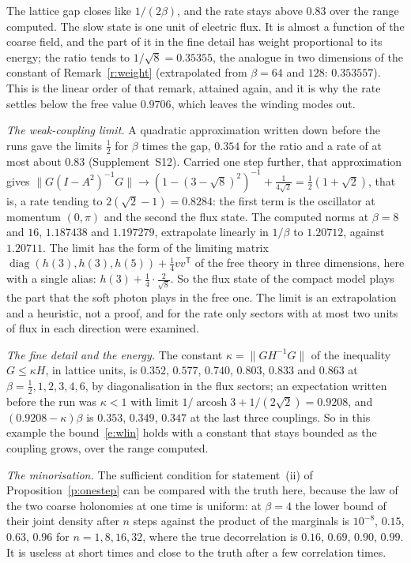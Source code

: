 The lattice gap closes like $1/(2\beta)$, and the rate stays above $0.83$ over the range computed. The slow
state is one unit of electric flux. It is almost a function of the coarse field, and the part of it in the
fine detail has weight proportional to its energy; the ratio tends to $1/\sqrt8=0.35355$, the analogue in two
dimensions of the constant of Remark~\ref{r:weight} (extrapolated from $\beta=64$ and $128$: $0.353557$). This
is the linear order of that remark, attained again, and it is why the rate settles below the free value $0.9706$, which
leaves the winding modes out.

\emph{The weak-coupling limit.} A quadratic approximation written down before the runs gave the limits
$\tfrac12$ for $\beta$ times the gap, $0.354$ for the ratio and a rate of at most about $0.83$
(Supplement~S12). Carried one step further, that approximation gives
$\|G(I-A^2)^{-1}G\|\to(1-(3-\sqrt8)^2)^{-1}+\tfrac1{4\sqrt2}=\tfrac12(1+\sqrt2)$, that is, a rate tending to
$2(\sqrt2-1)=0.8284$: the first term is the oscillator at momentum $(0,\pi)$ and the second the flux state.
The computed norms at $\beta=8$ and $16$, $1.187438$ and $1.197279$, extrapolate linearly in $1/\beta$ to
$1.20712$, against $1.20711$. The limit has the form of the limiting matrix
$\operatorname{diag}(h(3),h(3),h(5))+\tfrac14vv^{\mathsf T}$ of the free theory in three dimensions, here with
a single alias: $h(3)+\tfrac14\cdot\tfrac{2}{\sqrt8}$. So the flux state of the compact model plays the part
that the soft photon plays in the free one. The limit is an extrapolation and a heuristic, not a proof, and for the rate only sectors with at most two
units of flux in each direction were examined.

\emph{The fine detail and the energy.} The constant $\kappa=\|GH^{-1}G\|$ of the inequality
$G\le\kappa H$, in lattice units, is $0.352$, $0.577$, $0.740$, $0.803$, $0.833$ and $0.863$ at
$\beta=\tfrac12,1,2,3,4,6$, by diagonalisation in the flux sectors; an expectation written before the
run was $\kappa<1$ with limit $1/\!\operatorname{arcosh}3+1/(2\sqrt2)=0.9208$, and $(0.9208-\kappa)\beta$ is
$0.353$, $0.349$, $0.347$ at the last three couplings. So in this example the bound~\eqref{e:wlin} holds with a
constant that stays bounded as the coupling grows, over the range computed.

\emph{The minorisation.} The sufficient condition for statement~(ii) of
Proposition~\ref{p:onestep} can be compared with the truth here, because the law of the two coarse holonomies
at one time is uniform: at $\beta=4$ the lower bound of their joint density after $n$ steps against the
product of the marginals is $10^{-8}$, $0.15$, $0.63$, $0.96$ for $n=1,8,16,32$, where the true decorrelation is
$0.16$, $0.69$, $0.90$, $0.99$. It is useless at short times and close to the truth after a few correlation
times.

